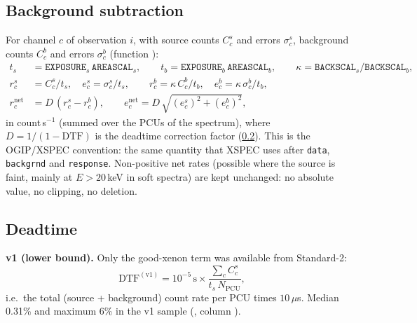 \subsection{Background subtraction}\label{sec:bkg}
For channel $c$ of observation $i$, with source counts $C^{s}_{c}$ and errors $\sigma^{s}_{c}$, background counts
$C^{b}_{c}$ and errors $\sigma^{b}_{c}$ (function ):
\begin{align}
t_s &= \mathtt{EXPOSURE}_s\,\mathtt{AREASCAL}_s, \qquad t_b = \mathtt{EXPOSURE}_b\,\mathtt{AREASCAL}_b,\qquad
\kappa = \mathtt{BACKSCAL}_s/\mathtt{BACKSCAL}_b, \nonumber\\
r^{s}_c &= C^{s}_c/t_s,\quad e^{s}_c = \sigma^{s}_c/t_s,\qquad r^{b}_c = \kappa\,C^{b}_c/t_b,\quad e^{b}_c=\kappa\,\sigma^{b}_c/t_b, \label{eq:srcbkg}\\
r^{\mathrm{net}}_c &= D\,(r^{s}_c - r^{b}_c),\qquad e^{\mathrm{net}}_c = D\,\sqrt{(e^{s}_c)^2 + (e^{b}_c)^2}, \label{eq:net}
\end{align}
in count\,s$^{-1}$ (summed over the PCUs of the spectrum), where $D = 1/(1-\mathrm{DTF})$ is the deadtime correction factor
(\cref{sec:deadtime}). This is the OGIP/XSPEC convention: the same quantity that XSPEC uses after \texttt{data},
\texttt{backgrnd} and \texttt{response}. Non-positive net rates (possible where the source is faint, mainly at
$E>20$\,keV in soft spectra) are kept unchanged: no absolute value, no clipping, no deletion.

\subsection{Deadtime}\label{sec:deadtime}
\textbf{v1 (lower bound).} Only the good-xenon term was available from Standard-2:
\begin{equation}
\mathrm{DTF}^{(\mathrm{v1})} = 10^{-5}\,\mathrm{s}\times \frac{\sum_c C^{s}_c}{t_s\,N_\mathrm{PCU}} ,\label{eq:dtfv1}
\end{equation}
i.e.\ the total (source + background) count rate per PCU times $10\,\mu$s. Median 0.31\% and maximum 6\% in the v1
sample (, column ).

